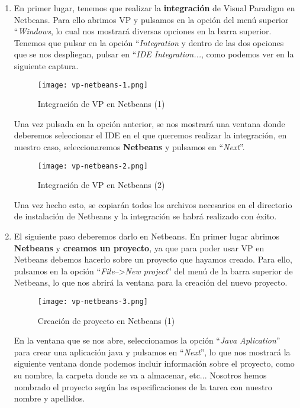 \begin{enumerate}
    \item En primer lugar, tenemos que realizar la \textbf{integración} de Visual Paradigm en Netbeans. Para ello abrimos VP y pulsamos en la opción del menú superior ``\textit{Windows}, lo cual nos mostrará diversas opciones  en la barra superior. Tenemos que pulsar en la opción ``\textit{Integration} y dentro de las dos opciones que se nos despliegan, pulsar en ``\textit{IDE Integration...}, como podemos ver en la siguiente captura.

    \begin{figure}[H]
        \centering
        \texttt{[image: vp-netbeans-1.png]}
        \caption{Integración de VP en Netbeans (1)}
    \end{figure}

    Una vez pulsada en la opción anterior, se nos mostrará una ventana donde deberemos seleccionar el IDE en el que queremos realizar la integración, en nuestro caso, seleccionaremos \textbf{Netbeans} y pulsamos en ``\textit{Next}''.

     \begin{figure}[H]
        \centering
        \texttt{[image: vp-netbeans-2.png]}
        \caption{Integración de VP en Netbeans (2)}
    \end{figure}

    Una vez hecho esto, se copiarán todos los archivos necesarios en el directorio de instalación de Netbeans y la integración se habrá realizado con éxito.


    \item El siguiente paso deberemos darlo en Netbeans. En primer lugar abrimos \textbf{Netbeans} y \textbf{creamos un proyecto}, ya que para poder usar VP en Netbeans debemos hacerlo sobre un proyecto que hayamos creado. Para ello, pulsamos en la opción ``\textit{File}-->\textit{New project}'' del menú de la barra superior de Netbeans, lo que nos abrirá la ventana para la creación del nuevo proyecto.

    \begin{figure}[H]
        \centering
        \texttt{[image: vp-netbeans-3.png]}
        \caption{Creación de proyecto en Netbeans (1)}
    \end{figure}

    En la ventana que se nos abre, seleccionamos la opción ``\textit{Java Aplication}'' para crear una aplicación java y pulsamos en ``\textit{Next}'', lo que nos mostrará la siguiente ventana donde podemos incluir información sobre el proyecto, como su nombre, la carpeta donde se va a almacenar, etc... Nosotros hemos nombrado el proyecto según las especificaciones de la tarea con nuestro nombre y apellidos.


\end{enumerate}
